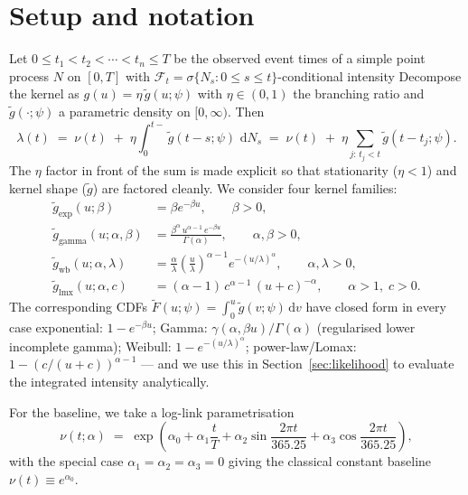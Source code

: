 \documentclass[article,shortnames,nojss]{jss}
\newcommand{\rmd}{\,\mathrm{d}}
\newcommand{\1}{\mathbbm{1}}
\theoremstyle{plain}
\theoremstyle{definition}
\begin{document}
\section{Setup and notation}\label{sec:setup}

Let $0 \le t_1 < t_2 < \cdots < t_n \le T$ be the observed event
times of a simple point process $N$ on $[0,T]$ with $\mathcal{F}_t =
\sigma\{N_s : 0 \le s \le t\}$-conditional intensity
Decompose the kernel as $g(u) = \eta\,\tilde g(u; \psi)$ with
$\eta \in (0,1)$ the branching ratio and $\tilde g(\cdot;\psi)$
a parametric density on $[0,\infty)$.  Then
\begin{equation}\label{eq:lambda-of-t}
  \lambda(t) \;=\; \nu(t)
  \;+\; \eta\int_{0}^{t-}\! \tilde g(t-s;\psi)\,\rmd N_s
  \;=\; \nu(t) \;+\; \eta\sum_{j:\,t_j<t} \tilde g(t-t_j;\psi).
\end{equation}
The $\eta$ factor in front of the sum is made explicit so that
stationarity ($\eta<1$) and kernel shape ($\tilde g$) are
factored cleanly.  We consider four kernel families:
\begin{align}
  \tilde g_{\text{exp}}(u;\beta) &= \beta e^{-\beta u}, \qquad \beta>0, \label{eq:exp-kernel}\\
  \tilde g_{\text{gamma}}(u;\alpha,\beta) &= \frac{\beta^{\alpha}\,u^{\alpha-1}\,e^{-\beta u}}{\Gamma(\alpha)},
    \qquad \alpha,\beta>0, \label{eq:gamma-kernel}\\
  \tilde g_{\text{wb}}(u;\alpha,\lambda) &= \frac{\alpha}{\lambda}
    \!\left(\!\frac{u}{\lambda}\!\right)^{\!\alpha-1}\!
    e^{-(u/\lambda)^{\alpha}}, \qquad \alpha,\lambda>0, \label{eq:weibull-kernel}\\
  \tilde g_{\text{lmx}}(u;\alpha,c) &= (\alpha-1)\,c^{\alpha-1}\,(u+c)^{-\alpha},
    \qquad \alpha>1,\; c>0. \label{eq:lomax-kernel}
\end{align}
The corresponding CDFs $\tilde F(u;\psi) = \int_0^u \tilde
g(v;\psi)\rmd v$ have closed form in every case
\textemdash exponential: $1-e^{-\beta u}$;
Gamma: $\gamma(\alpha,\beta u)/\Gamma(\alpha)$ (regularised lower incomplete gamma);
Weibull: $1-e^{-(u/\lambda)^\alpha}$;
power-law/Lomax: $1-(c/(u+c))^{\alpha-1}$ --- and we use this in
Section~\ref{sec:likelihood} to evaluate the integrated intensity
analytically.

For the baseline, we take a log-link parametrisation
\begin{equation}\label{eq:baseline}
  \nu(t;\alpha) \;=\; \exp\!\left(\alpha_0
      + \alpha_1\frac{t}{T}
      + \alpha_2 \sin\!\frac{2\pi t}{365.25}
      + \alpha_3 \cos\!\frac{2\pi t}{365.25}\right),
\end{equation}
with the special case $\alpha_1=\alpha_2=\alpha_3=0$ giving the
classical constant baseline $\nu(t) \equiv e^{\alpha_0}$.
\end{document}
